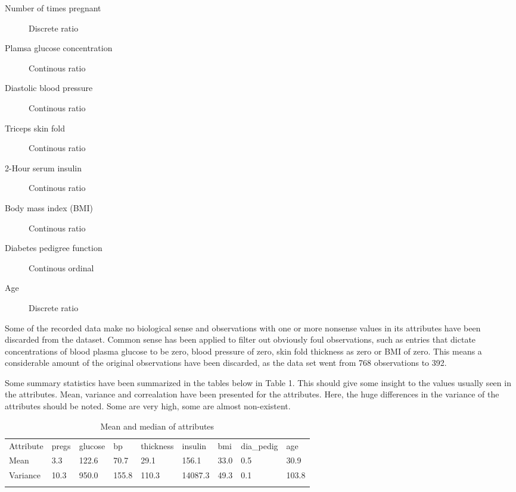 \begin{description}
\item [Number of times pregnant] Discrete ratio
\item [Plamsa glucose concentration] Continous ratio
\item [Diastolic blood pressure] Continous ratio
\item [Triceps skin fold] Continous ratio
\item [2-Hour serum insulin] Continous ratio
\item [Body mass index (BMI)] Continous ratio
\item [Diabetes pedigree function] Continous ordinal
\item [Age] Discrete ratio
\end{description}


Some of the recorded data make no biological sense and observations with one or
more nonsense values in its attributes have been discarded from the dataset.
Common sense has been applied to filter out obviously foul observations, such
as entries that dictate concentrations of blood plasma glucose to be zero, blood
pressure of zero, skin fold thickness as zero or BMI of zero. This means a
considerable amount of the original observations have been discarded, as the
data set went from 768 observations to 392.
\bigskip

Some summary statistics have been summarized in the tables below in Table 1. This should
give some insight to the values usually seen in the attributes. Mean, variance
and correalation have been presented for the attributes. Here, the huge differences
in the variance of the attributes should be noted. Some are very high, some are
almost non-existent.

\begin{table}[]
\centering
\caption{Mean and median of attributes}
\label{tab:stats}
\begin{tabular}{lllllllll}
\cline{1-1}
\multicolumn{1}{|l|}{Attribute} & pregs & glucose & bp   & thickness & insulin & bmi  & dia\_pedig & age  \\ \cline{1-1}
\multicolumn{1}{|l|}{Mean}      & 3.3   & 122.6   & 70.7 & 29.1      & 156.1   & 33.0 & 0.5        & 30.9 \\ \cline{1-1}
\multicolumn{1}{|l|}{Variance}  & 10.3     & 950.0     & 155.8   & 110.3        & 14087.3    & 49.3 & 0.1       & 103.8 \\ \cline{1-1}
                                                       &       &         &      &           &         &      &            &      \\ \hline
\end{tabular}
\end{table}

